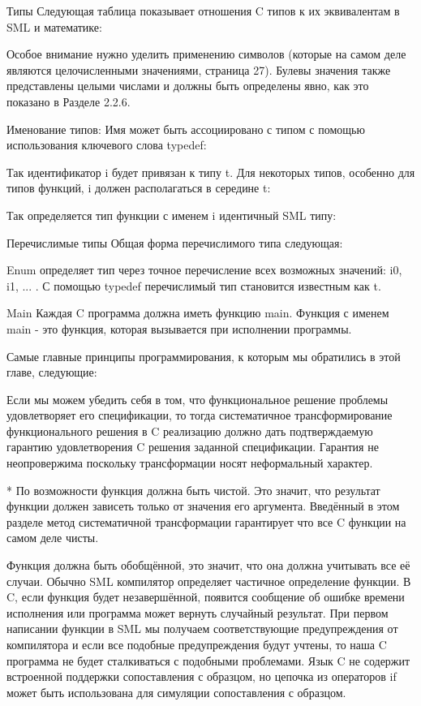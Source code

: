 Типы Следующая таблица показывает отношения C типов к их эквивалентам в SML и математике:

Особое внимание нужно уделить применению символов (которые на самом деле являются целочисленными значениями, страница 27). Булевы значения также представлены целыми числами и должны быть определены явно, как это показано в Разделе 2.2.6.

Именование типов: Имя может быть ассоциировано с типом с помощью использования ключевого слова typedef:

Так идентификатор i будет привязан к типу t. Для некоторых типов, особенно для типов функций, i должен располагаться в середине t:

Так определяется тип функции с именем i идентичный SML типу:

Перечислимые типы Общая форма перечислимого типа следующая:

Enum определяет тип через точное перечисление всех возможных значений: i0, i1, ... . С помощью typedef перечислимый тип становится известным как t.

Main Каждая C программа должна иметь функцию main. Функция с именем main - это функция, которая вызывается при исполнении программы.

Самые главные принципы программирования, к которым мы обратились в этой главе, следующие:

Если мы можем убедить себя в том, что функциональное решение проблемы удовлетворяет его спецификации, то тогда систематичное трансформирование функционального решения в C реализацию должно дать подтверждаемую гарантию удовлетворения C решения заданной спецификации. Гарантия не неопровержима поскольку трансформации носят неформальный характер.

* По возможности функция должна быть чистой. Это значит, что результат функции должен зависеть только от значения его аргумента. Введённый в этом разделе метод систематичной трансформации гарантирует что все C функции на самом деле чисты.

Функция должна быть обобщённой, это значит, что она должна учитывать все её случаи. Обычно SML компилятор определяет частичное определение функции. В C, если функция будет незавершённой, появится сообщение об ошибке времени исполнения или программа может вернуть случайный результат. При первом написании функции в SML мы получаем соответствующие предупреждения от компилятора и если все подобные предупреждения будут учтены, то наша C программа не будет сталкиваться с подобными проблемами. Язык C не содержит встроенной поддержки сопоставления с образцом, но цепочка из операторов if может быть использована для симуляции сопоставления с образцом.

